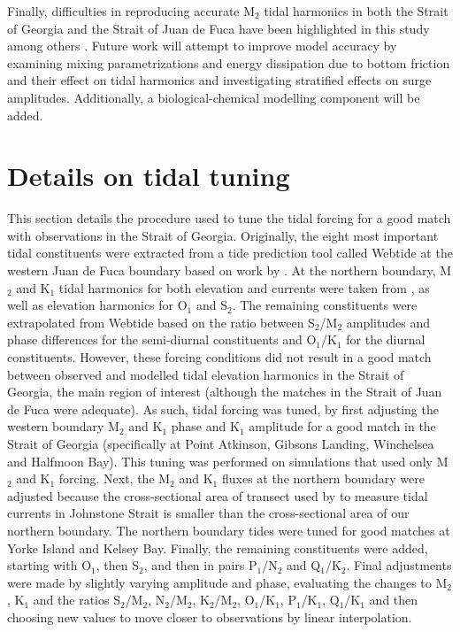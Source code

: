 \documentclass[letterpaper]{tATO2e}
\begin{document}
Finally, difficulties in reproducing accurate M$_2$ tidal harmonics in both the Strait of Georgia and the Strait of Juan de Fuca have been highlighted in this study among others \citep{stronach1993update, foreman2004m}. Future work will attempt to improve model accuracy by examining mixing parametrizations and energy dissipation due to bottom friction and their effect on tidal harmonics {\color{red} and investigating stratified effects on surge amplitudes.} Additionally, a biological-chemical modelling component will be added. 





\appendices
\section{Details on tidal tuning}\label{sec:appendix}
This section details the procedure used to tune the tidal forcing for a good match with observations in the Strait of Georgia. Originally, the eight most important tidal constituents were extracted from a tide prediction tool called Webtide \citep{webtide} at the western Juan de Fuca boundary based on work by \citet{foreman2000webtide}. At the northern boundary,  M$_2$ and K$_1$ tidal harmonics for both elevation and currents were taken from \citet{thomson1980johnstone}, as well as elevation harmonics for O$_1$ and S$_2$. The remaining constituents were extrapolated from Webtide based on the ratio between S$_2$/M$_2$ amplitudes and phase differences for the semi-diurnal constituents and O$_1$/K$_1$ for the diurnal constituents. However, these forcing conditions did not result in a good match between observed and modelled tidal elevation harmonics in the Strait of Georgia, the main region of interest (although the matches in the Strait of Juan de Fuca were adequate). As such, tidal forcing was tuned, by first adjusting the western boundary M$_2$ and K$_1$ phase and K$_1$ amplitude for a good match in the Strait of Georgia (specifically at Point Atkinson, Gibsons Landing, Winchelsea and Halfmoon Bay). This tuning was performed on simulations that used only M$_2$ and K$_1$ forcing. Next, the M$_2$ and K$_1$ fluxes at the northern boundary were adjusted because the cross-sectional area of transect used by \citet{thomson1980johnstone} to measure tidal currents in Johnstone Strait is smaller than the cross-sectional area of our northern boundary. {\color{red} The northern boundary tides were tuned for good matches at Yorke Island  and Kelsey Bay.} Finally, the remaining constituents were added, starting with O$_1$, then S$_2$, and then in pairs P$_1$/N$_2$ and Q$_1$/K$_2$. Final adjustments were made by slightly varying amplitude and phase, evaluating the changes to M$_2$, K$_1$ and the ratios S$_2$/M$_2$, N$_2$/M$_2$, K$_2$/M$_2$, O$_1$/K$_1$, P$_1$/K$_1$, Q$_1$/K$_1$ and then choosing new values to move closer to observations by linear interpolation. 
\end{document}
